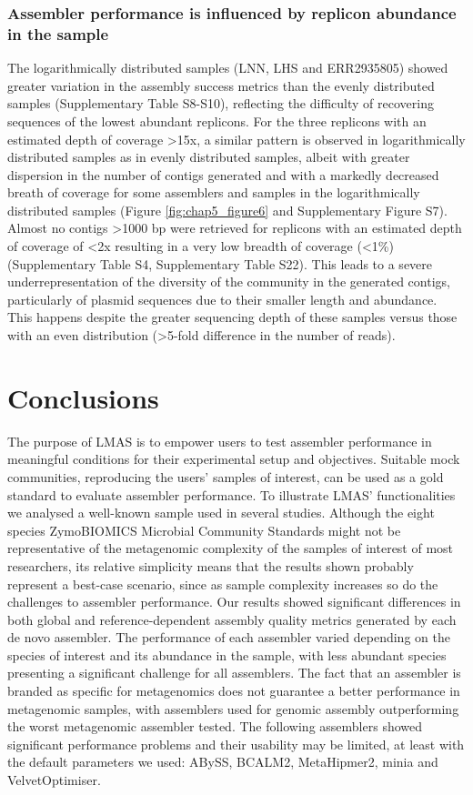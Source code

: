 \subsubsection{Assembler performance is influenced by replicon abundance in the sample}

The logarithmically distributed samples (LNN, LHS and ERR2935805) showed greater variation in the assembly success metrics than the evenly distributed samples (Supplementary Table S8-S10), reflecting the difficulty of recovering sequences of the lowest abundant replicons. For the three replicons with an estimated depth of coverage >15x, a similar pattern is observed in logarithmically distributed samples as in evenly distributed samples, albeit with greater dispersion in the number of contigs generated and with a markedly decreased breath of coverage for some assemblers and samples in the logarithmically distributed samples (Figure \ref{fig:chap5_figure6} and Supplementary Figure S7). Almost no contigs >1000 \ac{bp} were retrieved for replicons with an estimated depth of coverage of <2x resulting in a very low breadth of coverage (<1\%) (Supplementary Table S4, Supplementary Table S22). This leads to a severe underrepresentation of the diversity of the community in the generated contigs, particularly of plasmid sequences due to their smaller length and abundance. This happens despite the greater sequencing depth of these samples versus those with an even distribution (>5-fold difference in the number of reads).

\section{Conclusions}

The purpose of LMAS is to empower users to test assembler performance in meaningful conditions for their experimental setup and objectives. Suitable mock communities, reproducing the users’ samples of interest, can be used as a gold standard to evaluate assembler performance. To illustrate LMAS’ functionalities we analysed a well-known sample used in several studies. Although the eight species ZymoBIOMICS Microbial Community Standards might not be representative of the metagenomic complexity of the samples of interest of most researchers, its relative simplicity means that the results shown probably represent a best-case scenario, since as sample complexity increases so do the challenges to assembler performance. Our results showed significant differences in both global and reference-dependent assembly quality metrics generated by each de novo assembler. The performance of each assembler varied depending on the species of interest and its abundance in the sample, with less abundant species presenting a significant challenge for all assemblers. The fact that an assembler is branded as specific for metagenomics does not guarantee a better performance in metagenomic samples, with assemblers used for genomic assembly outperforming the worst metagenomic assembler tested. The following assemblers showed significant performance problems and their usability may be limited, at least with the default parameters we used: ABySS, BCALM2, MetaHipmer2, minia and VelvetOptimiser.

